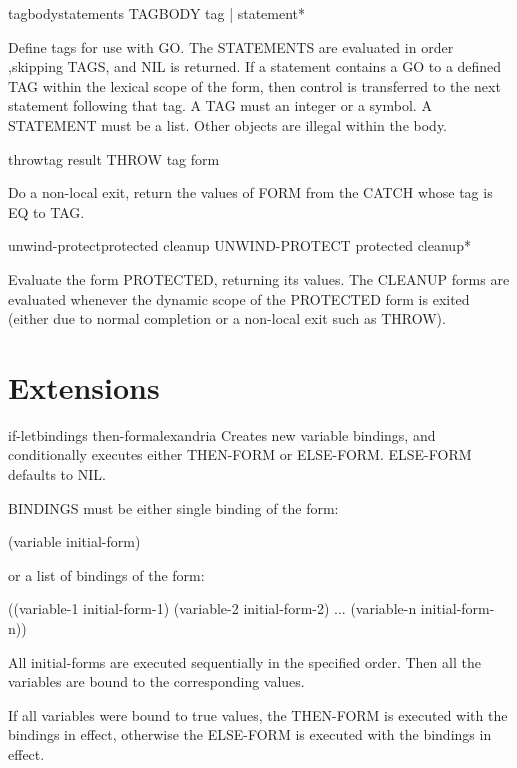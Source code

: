 \begin{specialop}{tagbody}{\rest statements}{}{}
  TAGBODY {tag | statement}*

Define tags for use with GO. The STATEMENTS are evaluated in order ,skipping
TAGS, and NIL is returned. If a statement contains a GO to a defined TAG
within the lexical scope of the form, then control is transferred to the next
statement following that tag. A TAG must an integer or a symbol. A STATEMENT
must be a list. Other objects are illegal within the body.
\end{specialop}

\begin{specialop}{throw}{tag result}{}{}
  THROW tag form

Do a non-local exit, return the values of FORM from the CATCH whose tag is EQ
to TAG.
\end{specialop}

\begin{specialop}{unwind-protect}{protected \body cleanup}{}{}
  UNWIND-PROTECT protected cleanup*

Evaluate the form PROTECTED, returning its values. The CLEANUP forms are
evaluated whenever the dynamic scope of the PROTECTED form is exited (either
due to normal completion or a non-local exit such as THROW).
\end{specialop}

\section{Extensions}
\label{sec:extensions}

\begin{macro}{if-let}{bindings \body then-form}{alexandria}{}
  Creates new variable bindings, and conditionally executes either
THEN-FORM or ELSE-FORM. ELSE-FORM defaults to NIL.

BINDINGS must be either single binding of the form:

 (variable initial-form)

or a list of bindings of the form:

 ((variable-1 initial-form-1)
  (variable-2 initial-form-2)
  ...
  (variable-n initial-form-n))

All initial-forms are executed sequentially in the specified order. Then all
the variables are bound to the corresponding values.

If all variables were bound to true values, the THEN-FORM is executed with the
bindings in effect, otherwise the ELSE-FORM is executed with the bindings in
effect.
\end{macro}

